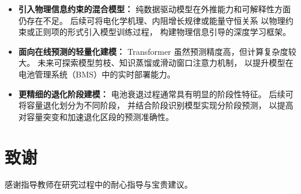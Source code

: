 \documentclass[UTF8,a4paper,12pt,fontset=fandol]{ctexart}
\begin{document}
\begin{itemize}
  \item \textbf{引入物理信息约束的混合模型：}
  纯数据驱动模型在外推能力和可解释性方面仍存在不足。
  后续可将电化学机理、内阻增长规律或能量守恒关系
  以物理约束或正则项的形式引入模型训练过程，
  构建物理信息引导的深度学习框架。

  \item \textbf{面向在线预测的轻量化建模：}
  Transformer 虽然预测精度高，但计算复杂度较大。
  未来可探索模型剪枝、知识蒸馏或滑动窗口注意力机制，
  以提升模型在电池管理系统（BMS）中的实时部署能力。

  \item \textbf{更精细的退化阶段建模：}
  电池衰退过程通常具有明显的阶段性特征。
  后续可将容量退化划分为不同阶段，
  并结合阶段识别模型实现分阶段预测，
  以提高对容量突变和加速退化区段的预测准确性。
\end{itemize}

\section*{致谢}
感谢指导教师在研究过程中的耐心指导与宝贵建议。
\end{document}
